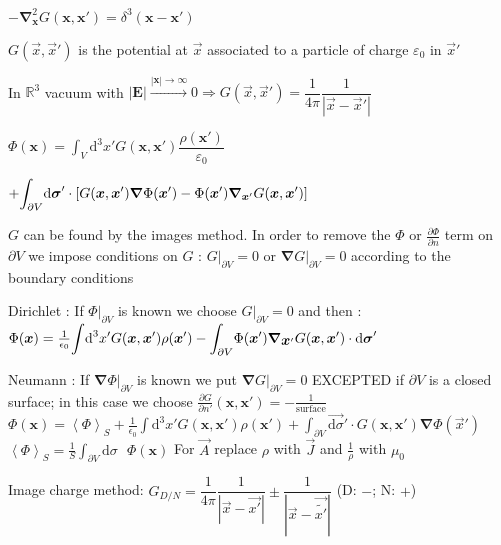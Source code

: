 \begin{squishlist}
\item $-\boldsymbol{\nabla}_{\boldsymbol{x}}^2 G(\boldsymbol{x}, \boldsymbol{x}') = \delta^3(\boldsymbol{x}-\boldsymbol{x}')$

$G(\vec{x},\vec{x}')$ is the potential at $\vec{x}$ associated to a particle of charge $\varepsilon_0$ in $\vec{x}'$
\item In $\mathbb{R}^3$ vacuum with $|\boldsymbol{E}| \overset{|\boldsymbol{x}|\to \infty}{\longrightarrow} 0 \Rightarrow G(\vec{x},\vec{x}') = \dfrac{1}{4\pi}\dfrac{1}{|\vec{x} - \vec{x}'|}$\\ 

\item $\Phi(\boldsymbol{x}) = \displaystyle{\int_V} \text{d}^3 x' G(\boldsymbol{x}, \boldsymbol{x}')\dfrac{\rho(\boldsymbol{x}')}{\varepsilon_0}$ 

$+ \displaystyle{\int_{\partial V}} \boldsymbol{\textrm{d} \sigma}' \cdot \left[G(\boldsymbol{x}, \boldsymbol{x}')\boldsymbol{\nabla}\Phi(\boldsymbol{x}')-\Phi(\boldsymbol{x}')\boldsymbol{\nabla}_{\boldsymbol{x}'}G(\boldsymbol{x}, \boldsymbol{x}')\right]$

$G$ can be found by the images method. In order to remove the $\Phi$ or $\frac{\partial \Phi}{\partial n}$ term on $\partial V$ we impose conditions on $G$ : $G|_{\partial V}=0$ or  $\boldsymbol{\nabla}G|_{\partial V}=0$ according to the boundary conditions

\item Dirichlet : If $\Phi|_{\partial V}$ is known we choose $G|_{\partial V} =0$ and then :
\\
$\Phi(\boldsymbol{x}) =\frac{1}{\epsilon_0} \displaystyle{\int} \text{d}^3x' G(\boldsymbol{x}, \boldsymbol{x}')\rho(\boldsymbol{x}') - \displaystyle{\int_{\partial V}} \Phi(\mbox{\boldmath$x$}') \mbox{\boldmath$\nabla$}_{\mbox{\boldmath$x$}'} G(\mbox{\boldmath$x$},\mbox{\boldmath$x$}') \cdot \mbox{\boldmath$\textrm{d} \sigma$}'$
\item Neumann : If $\boldsymbol{\nabla}\Phi|_{\partial V}$ is known we put $\boldsymbol{\nabla} G |_{\partial V}=0$ EXCEPTED if $\partial V$ is a closed surface; in this case we choose
$\frac{\partial G}{\partial n'}(\boldsymbol{x}, \boldsymbol{x}')= -\frac{1}{\text{surface}}$
\\
$\Phi(\boldsymbol{x}) = \left\langle \Phi \right\rangle _S + \frac{1}{\epsilon_0}\displaystyle{\int} \text{d}^3x' G(\boldsymbol{x}, \boldsymbol{x}')\rho(\boldsymbol{x}')+\displaystyle{\int_{\partial V}} \vec{\text{d}\sigma}' \cdot G(\boldsymbol{x}, \boldsymbol{x}')\boldsymbol{\nabla}\Phi(\vec{x}')$
\\
$\left\langle \Phi \right\rangle _S = \frac{1}{S}\displaystyle{\int_{\partial V}} \text{d}\sigma \text{ } \Phi(\boldsymbol{x})$ \hfill For $\vec{A}$ replace $\rho$ with $\vec{J}$ and $\frac{1}{\rho}$ with $\mu_0$

\item Image charge method: $G_{D/N} = \dfrac{1}{4\pi} \dfrac{1}{|\vec{x} - \vec{x'}|} \pm \dfrac{1}{|\vec{x} - {\vec{\tilde{x'}}}|}$ (D: $-$; N: $+$)

\end{squishlist}
